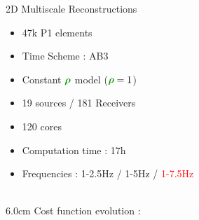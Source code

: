 \begin{frame}[noframenumbering]{2D Multiscale Reconstructions}

  \begin{multicols}{2}
    \begin{itemize}
    \item 47k P1 elements
    \item Time Scheme : AB3
    \item Constant $\density$ model ($\density=1$)
    \item 19 sources / 181 Receivers
    \item 120 cores
    \item Computation time : 17h
    \item Frequencies : 1-2.5Hz / 1-5Hz / \textcolor{red}{1-7.5Hz} \\ ~
    \end{itemize}
    \columnbreak

    \setlength{\plotwidth} {6.0cm}
    \setlength{\plotheight}{5cm}
    Cost function evolution :
    \begin{figure}
    \end{figure}
  \end{multicols}
\end{frame}



